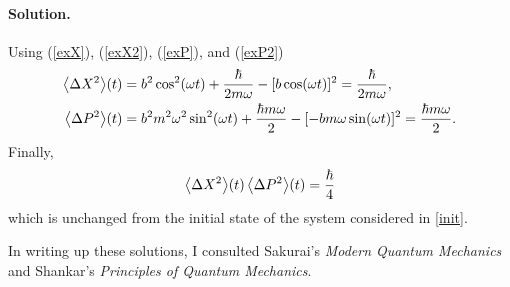 \documentclass[11pt]{article}
\newcommand{\refeq}[1]{(\ref{#1})}
\newenvironment{solution}
{
    \paragraph{Solution.}
    \ignorespaces
}
{
}
\begin{document}
\begin{solution}
	Using \refeq{exX}, \refeq{exX2}, \refeq{exP}, and \refeq{exP2}
	\begin{align}
		\evDXqt &= b^2 \cosqwt + \frac{\hbar}{2 m \omega} - [b \coswt]^2 = \frac{\hbar}{2 m \omega}, \\
		\evDPqt &= b^2 m^2 \omega^2 \sinqwt + \frac{\hbar m \omega}{2} - [-b m \omega \sinwt]^2 = \frac{\hbar m \omega}{2}.
	\end{align}
	Finally,
	\begin{equation}
		\evDXqt \evDPqt = \frac{\hbar}{4}
	\end{equation}
	which is unchanged from the initial state of the system considered in \ref{init}.
\end{solution}

In writing up these solutions, I consulted Sakurai's \emph{Modern Quantum Mechanics} and Shankar's \emph{Principles of Quantum Mechanics}.
\end{document}
